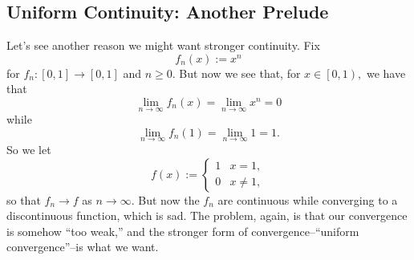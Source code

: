 \subsection{Uniform Continuity: Another Prelude}
Let's see another reason we might want stronger continuity. Fix
\[f_n(x):=x^n\]
for $f_n:[0,1]\to[0,1]$ and $n\ge0.$ But now we see that, for $x\in\left[0,1\right),$ we have that
\[\lim_{n\to\infty}f_n(x)=\lim_{n\to\infty}x^n=0\]
while
\[\lim_{n\to\infty}f_n(1)=\lim_{n\to\infty}1=1.\]
So we let
\[f(x):=\begin{cases}
	1 & x=1, \\
	0 & x\ne1,
\end{cases}\]
so that $f_n\to f$ as $n\to\infty.$ But now the $f_n$ are continuous while converging to a discontinuous function, which is sad. The problem, again, is that our convergence is somehow ``too weak,'' and the stronger form of convergence--``uniform convergence''--is what we want.